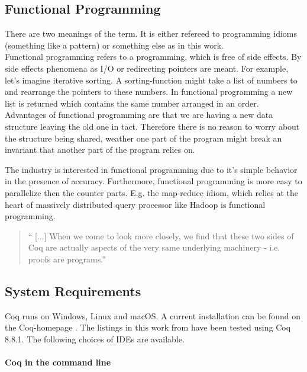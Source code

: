 \subsection{Functional Programming}

There are two meanings of the term. 
It is either refereed to programming idioms (something like a pattern) or something else as in this work.\\

Functional programming refers to a programming, which is free of side effects.
By side effects phenomena as I/O or redirecting pointers are meant. 
For example, let's imagine iterative sorting. 
A sorting-function might take a list of numbers to and rearrange the pointers to these numbers.
In functional programming a new list is returned which contains the same number arranged in an order.\\ 
Advantages of functional programming are  that we are having a new data structure leaving the old one in tact. 
Therefore there is no reason to worry about the structure being shared, weather one part of the program might break an invariant that another part of the program relies on.\par
The industry is interested in functional programming due to it's simple behavior in the presence of accuracy.
Furthermore, functional programming is more easy to parallelize then the counter parts.
E.g. the map-reduce idiom, which relies at the heart of massively distributed query processor like \gls{Hadoop} is functional programming. 

\begin{quote}
`` [...] When we come to look more closely, we find that these two sides of Coq are actually aspects of the very same underlying machinery - i.e. proofs are programs.'' 
\end{quote}




\subsection{System Requirements}

Coq runs on Windows, Linux and macOS.
A current installation can be found on the Coq-homepage \cite{}. 
The listings in this work from \cite{PACGGHSY} have been tested using Coq 8.8.1.
The following choices of IDEs are available. 


\paragraph{Coq in the command line}

